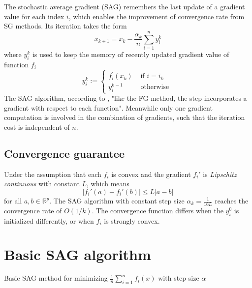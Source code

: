 The stochastic average gradient (SAG) remembers the last update of a gradient value for each index $i$, which enables the improvement of convergence rate from SG methods. Its iteration takes the form
\begin{equation}
x_{k+1} = x_k - \frac{\alpha_k}{n} \sum^n_{i=1}y_{i}^{k}
\end{equation}
where $y_{i}^{k}$ is used to keep the memory of recently updated gradient value of function $f_i$
\begin{equation}
y_{i}^{k}:=\left\{\begin{array}{ll}
    f_{i}^{\prime}\left(x_{k}\right) & \text { if } i=i_{k} \\
    y_{i}^{k-1} & \text { otherwise }
    \end{array}\right.
\end{equation}
The SAG algorithm, according to \citeauthor{schmidtMinimizingFiniteSums2016}, "like the FG method, the step incorporates a gradient with respect to each function". Meanwhile only one gradient computation is involved in the combination of gradients, such that the iteration cost is independent of $n$.

\subsection{Convergence guarantee}

Under the assumption that each $f_i$ is convex and the gradient $f_i\prime$ is \textit{Lipschitz continuous} with constant $L$, which means
\begin{equation}
|f_i\prime (a) - f_i\prime (b)| \leq L|a-b|
\end{equation}
for all $a,b \in \mathbb{R}^p$.
The SAG algorithm with constant step size $\alpha_k = \frac{1}{16L}$ reaches the convergence rate of $O(1/k)$. The convergence function differs when the $y_i^0$ is initialized differently, or when $f_i$ is strongly convex.


\section{Basic SAG algorithm}

\begin{algorithm}
    \caption{Basic SAG method for minimizing $\frac{1}{n} \sum^n_{i=1}f_i(x)$ with step size $\alpha$}\label{alg:SAG_ori}
        \begin{algorithmic}[1]
                       
            \EndFor
        \end{algorithmic}
\end{algorithm}

